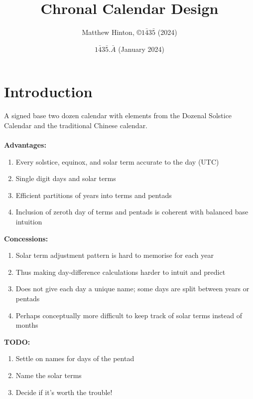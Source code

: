 \documentclass[12 pt]{article}%
\title{Chronal Calendar Design}
\author{Matthew Hinton, \copyright $1\bar43\bar5$ (2024)}
\date{$1\bar43\bar5.\bar{A}$ (January 2024)}
\begin{document}
\maketitle


\section{Introduction}

A signed base two dozen calendar with elements from the Dozenal Solstice Calendar and the traditional Chinese calendar.\\\\
\textbf{Advantages:}
\begin{enumerate}
  \item Every solstice, equinox, and solar term accurate to the day (UTC)
  \item Single digit days and solar terms
  \item Efficient partitions of years into terms and pentads
  \item Inclusion of zeroth day of terms and pentads is coherent with balanced base intuition
\end{enumerate}
\textbf{Concessions:}
\begin{enumerate}
  \item Solar term adjustment pattern is hard to memorise for each year
  \item Thus making day-difference calculations harder to intuit and predict
  \item Does not give each day a unique name; some days are split between years or pentads
  \item Perhaps conceptually more difficult to keep track of solar terms instead of months
\end{enumerate}
\bigskip
\textbf{TODO:}
\begin{enumerate}
  \item Settle on names for days of the pentad
  \item Name the solar terms
  \item Decide if it's worth the trouble!
\end{enumerate}


\newpage
\end{document}
